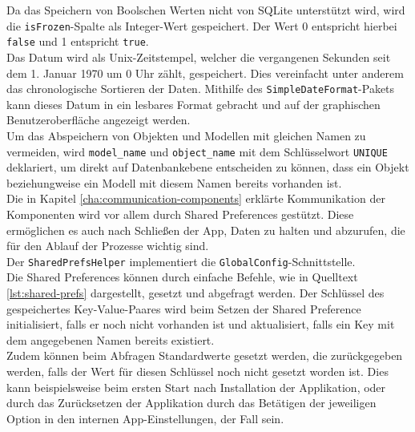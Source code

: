 \documentclass[oneside]{ausarbeitung}
\begin{document}
Da das Speichern von Boolschen Werten nicht von SQLite unterstützt wird, wird die \texttt{isFrozen}-Spalte als Integer-Wert gespeichert. Der Wert 0 entspricht hierbei \texttt{false} und 1 entspricht \texttt{true}.\\
Das Datum wird als Unix-Zeitstempel, welcher die vergangenen Sekunden seit dem 1. Januar 1970 um 0 Uhr zählt, gespeichert. Dies vereinfacht unter anderem das chronologische Sortieren der Daten. Mithilfe des \texttt{SimpleDateFormat}-Pakets kann dieses Datum in ein lesbares Format gebracht und auf der graphischen Benutzeroberfläche angezeigt werden.\\
Um das Abspeichern von Objekten und Modellen mit gleichen Namen zu vermeiden, wird \texttt{model\_name} und \texttt{object\_name} mit dem Schlüsselwort \texttt{UNIQUE} deklariert, um direkt auf Datenbankebene entscheiden zu können, dass ein Objekt beziehungweise ein Modell mit diesem Namen bereits vorhanden ist.\\
Die in Kapitel \ref{cha:communication-components} erklärte Kommunikation der Komponenten wird vor allem durch Shared Preferences gestützt. Diese ermöglichen es auch nach Schließen der App, Daten zu halten und abzurufen, die für den Ablauf der Prozesse wichtig sind.\\
Der \texttt{SharedPrefsHelper} implementiert die \texttt{GlobalConfig}-Schnittstelle.\\
Die Shared Preferences können durch einfache Befehle, wie in Quelltext \ref{lst:shared-prefs} dargestellt, gesetzt und abgefragt werden. Der Schlüssel des gespeichertes Key-Value-Paares wird beim Setzen der Shared Preference initialisiert, falls er noch nicht vorhanden ist und aktualisiert, falls ein Key mit dem angegebenen Namen bereits existiert.\\
Zudem können beim Abfragen Standardwerte gesetzt werden, die zurückgegeben werden, falls der Wert für diesen Schlüssel noch nicht gesetzt worden ist. Dies kann beispielsweise beim ersten Start nach Installation der Applikation, oder durch das Zurücksetzen der Applikation durch das Betätigen der jeweiligen Option in den internen App-Einstellungen, der Fall sein.
\end{document}
